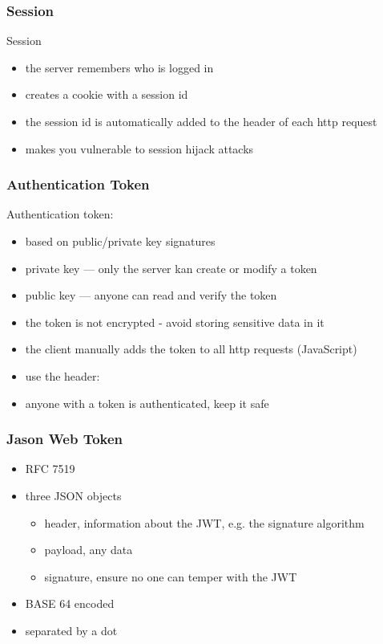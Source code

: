 \begin{frame}[fragile] \frametitle{Session}
Session
\begin{itemize}
  \item the server remembers who is logged in
  \item creates a cookie with a session id
  \item the session id is automatically added to the header of each http request
  \item makes you vulnerable to session hijack attacks
\end{itemize}
\vspace{5mm}
\end{frame}

\begin{frame}[fragile] \frametitle{Authentication Token}
Authentication token:
\begin{itemize}
  \item based on public/private key signatures
  \item private key --- only the server kan create or modify a token
  \item public key --- anyone can read and verify the token
  \item the token is not encrypted - avoid storing sensitive data in it
  \item the client manually adds the token to all http requests (JavaScript)
  \item use the header: 
  \item anyone with a token is authenticated, keep it safe
\end{itemize}
\end{frame}

\begin{frame}[fragile] \frametitle{Jason Web Token}
\begin{itemize}
  \item RFC 7519
  \item three JSON objects
  \begin{itemize}
    \item header, information about the JWT, e.g. the signature algorithm
    \item payload, any data
    \item signature, ensure no one can temper with the JWT
  \end{itemize}
  \item BASE 64 encoded
  \item separated by a dot
\end{itemize}
\end{frame}

